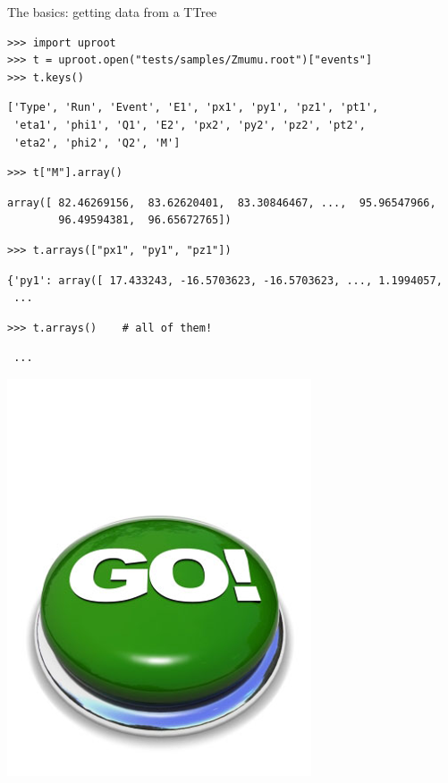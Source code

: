 \documentclass[aspectratio=169]{beamer}
\begin{document}
\begin{frame}[fragile]{The basics: getting data from a TTree}
\vspace{0.1 cm}
\small
\begin{verbatim}
>>> import uproot
>>> t = uproot.open("tests/samples/Zmumu.root")["events"]
>>> t.keys()
\end{verbatim}
\begin{verbatim}
['Type', 'Run', 'Event', 'E1', 'px1', 'py1', 'pz1', 'pt1',
 'eta1', 'phi1', 'Q1', 'E2', 'px2', 'py2', 'pz2', 'pt2',
 'eta2', 'phi2', 'Q2', 'M']
\end{verbatim}
\begin{verbatim}
>>> t["M"].array()
\end{verbatim}
\begin{verbatim}
array([ 82.46269156,  83.62620401,  83.30846467, ...,  95.96547966,
        96.49594381,  96.65672765])
\end{verbatim}
\begin{verbatim}
>>> t.arrays(["px1", "py1", "pz1"])
\end{verbatim}
\begin{verbatim}
{'py1': array([ 17.433243, -16.5703623, -16.5703623, ..., 1.1994057,
 ...
\end{verbatim}
\begin{verbatim}
>>> t.arrays()    # all of them!
\end{verbatim}
\begin{verbatim}
 ...
\end{verbatim}
\vspace{-7.6 cm}
\hfill \includegraphics[width=1.5 cm]{safe.png}\hspace{-0.9 cm}
\vspace{7.5 cm}
\end{frame}
\end{document}
